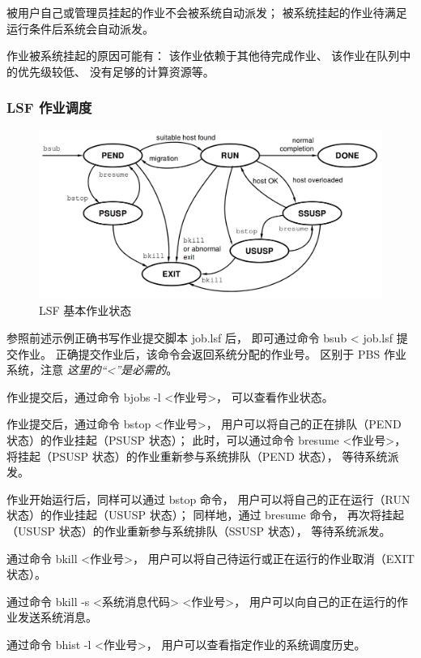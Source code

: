 \documentclass[UTF8]{ctexart}
\newcommand{\myem}[1]{{\color{red}\em #1}}
\newcommand{\mynnote}[1]{\colorbox{gray!15}{\color{blue!65}#1}}
\begin{document}
被用户自己或管理员挂起的作业不会被系统自动派发；
被系统挂起的作业待满足运行条件后系统会自动派发。

作业被系统挂起的原因可能有：
该作业依赖于其他待完成作业、
该作业在队列中的优先级较低、
没有足够的计算资源等。

\subsubsection{LSF 作业调度}
\begin{figure}[h]
  \centering
  \includegraphics[width=140mm]{material/bjobstate.png}
  \caption{LSF 基本作业状态}
\end{figure}

参照前述示例正确书写作业提交脚本 job.lsf 后，
即可通过命令 \mynnote{bsub < job.lsf} 提交作业。
正确提交作业后，该命令会返回系统分配的作业号。
区别于 PBS 作业系统，注意 \myem{这里的“<”是必需的}。

作业提交后，通过命令 \mynnote{bjobs -l <作业号>}，
可以查看作业状态。

作业提交后，通过命令 \mynnote{bstop <作业号>}，
用户可以将自己的正在排队（PEND 状态）的作业挂起（PSUSP 状态）；
此时，可以通过命令 \mynnote{bresume <作业号>}，
将挂起（PSUSP 状态）的作业重新参与系统排队（PEND 状态），
等待系统派发。

作业开始运行后，同样可以通过 bstop 命令，
用户可以将自己的正在运行（RUN 状态）的作业挂起（USUSP 状态）；
同样地，通过 bresume 命令，
再次将挂起（USUSP 状态）的作业重新参与系统排队（SSUSP 状态），
等待系统派发。

通过命令 \mynnote{bkill <作业号>}，
用户可以将自己待运行或正在运行的作业取消（EXIT 状态）。

通过命令 \mynnote{bkill -s <系统消息代码> <作业号>}，
用户可以向自己的正在运行的作业发送系统消息。

通过命令 \mynnote{bhist -l <作业号>}，
用户可以查看指定作业的系统调度历史。
\end{document}
